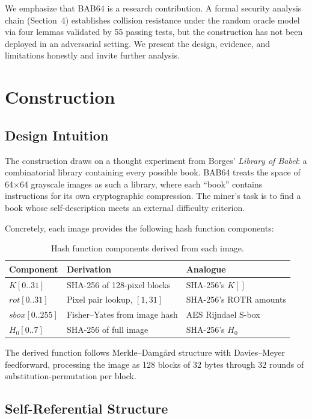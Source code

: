 \documentclass[preprint]{iacrtrans}
\begin{document}
We emphasize that BAB64 is a research contribution. A formal security analysis chain (Section~4) establishes collision resistance under the random oracle model via four lemmas validated by 55 passing tests, but the construction has not been deployed in an adversarial setting. We present the design, evidence, and limitations honestly and invite further analysis.

\section{Construction}

\subsection{Design Intuition}

The construction draws on a thought experiment from Borges' \emph{Library of Babel}: a combinatorial library containing every possible book. BAB64 treats the space of 64$\times$64 grayscale images as such a library, where each ``book'' contains instructions for its own cryptographic compression. The miner's task is to find a book whose self-description meets an external difficulty criterion.

Concretely, each image provides the following hash function components:

\begin{table}[h]
\centering
\small
\begin{tabular}{@{}lp{4.2cm}l@{}}
\toprule
\textbf{Component} & \textbf{Derivation} & \textbf{Analogue} \\
\midrule
$K[0..31]$ & SHA-256 of 128-pixel blocks & SHA-256's $K[]$ \\
$\mathit{rot}[0..31]$ & Pixel pair lookup, $[1, 31]$ & SHA-256's ROTR amounts \\
$\mathit{sbox}[0..255]$ & Fisher--Yates from image hash & AES Rijndael S-box \\
$H_0[0..7]$ & SHA-256 of full image & SHA-256's $H_0$ \\
\bottomrule
\end{tabular}
\caption{Hash function components derived from each image.}
\end{table}

The derived function follows Merkle--Damg{\aa}rd structure with Davies--Meyer feedforward, processing the image as 128 blocks of 32 bytes through 32 rounds of substitution-permutation per block.

\subsection{Self-Referential Structure}
\end{document}
